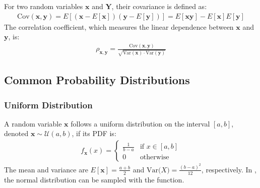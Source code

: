 \documentclass[letterpaper,10pt,english]{jupyterBook}
\begin{document}
\sphinxAtStartPar
For two random variables \(\mathbf x\) and \(\mathbf Y\), their covariance is defined as:
\begin{equation*}
\begin{split}
\text{Cov}(\mathbf x, \mathbf y) = E[(\mathbf x - E[\mathbf x])(\mathbf y - E[\mathbf y])] = E[\mathbf x\mathbf y] - E[\mathbf x]E[\mathbf y]
\end{split}
\end{equation*}
\sphinxAtStartPar
The correlation coefficient, which measures the linear dependence between \(\mathbf x\) and \(\mathbf y\), is:
\begin{equation*}
\begin{split}
\rho_{\mathbf x,\mathbf y} = \frac{\text{Cov}(\mathbf x, \mathbf y)}{\sqrt{\text{Var}(\mathbf x) \cdot \text{Var}(\mathbf y)}}
\end{split}
\end{equation*}

\subsection{Common Probability Distributions}
\label{\detokenize{01:common-probability-distributions}}

\subsubsection{Uniform Distribution}
\label{\detokenize{01:uniform-distribution}}
\sphinxAtStartPar
A random variable \(\mathbf x\) follows a uniform distribution on the interval \([a, b]\), denoted \(\mathbf x \sim \mathcal{U}(a, b)\), if its PDF is:
\begin{equation*}
\begin{split}
    f_{\mathbf x}(x) = \begin{cases}
    \frac{1}{b - a} & \text{if } x \in [a, b] \\
    0 & \text{otherwise}
    \end{cases}
\end{split}
\end{equation*}
\sphinxAtStartPar
The mean and variance are \(E[\mathbf x] = \frac{a + b}{2}\) and \(\text{Var}\mathbf (X) = \frac{(b - a)^2}{12}\), respectively.
In , the normal distribution can be sampled with the  function.
\end{document}
